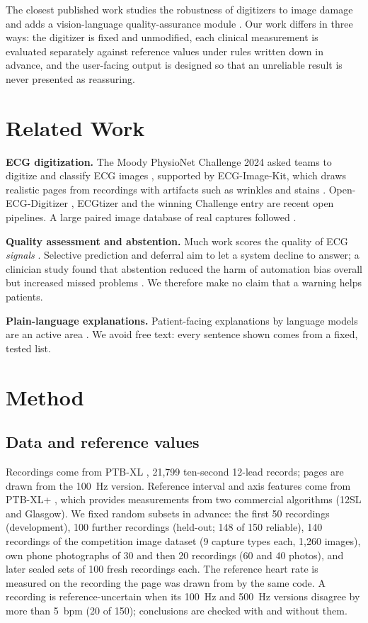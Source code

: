 \documentclass[conference]{IEEEtran}
\begin{document}
The closest published work studies the robustness of digitizers to image damage \cite{ref54} and adds a vision-language quality-assurance module \cite{ref55}. Our work differs in three ways: the digitizer is fixed and unmodified, each clinical measurement is evaluated separately against reference values under rules written down in advance, and the user-facing output is designed so that an unreliable result is never presented as reassuring.

\section{Related Work}

\textbf{ECG digitization.} The Moody PhysioNet Challenge 2024 asked teams to digitize and classify ECG images \cite{ref2}, supported by ECG-Image-Kit, which draws realistic pages from recordings with artifacts such as wrinkles and stains \cite{ref1}. Open-ECG-Digitizer \cite{ref5}, ECGtizer \cite{ref3} and the winning Challenge entry \cite{ref53} are recent open pipelines. A large paired image database of real captures followed \cite{ref4}.

\textbf{Quality assessment and abstention.} Much work scores the quality of ECG \emph{signals} \cite{ref12,ref13,ref14}. Selective prediction and deferral \cite{ref23,ref24} aim to let a system decline to answer; a clinician study found that abstention reduced the harm of automation bias overall but increased missed problems \cite{ref26}. We therefore make no claim that a warning helps patients.

\textbf{Plain-language explanations.} Patient-facing explanations by language models are an active area \cite{ref33}. We avoid free text: every sentence shown comes from a fixed, tested list.

\section{Method}

\subsection{Data and reference values}
Recordings come from PTB-XL \cite{ref45}, 21{,}799 ten-second 12-lead records; pages are drawn from the 100~Hz version. Reference interval and axis features come from PTB-XL+ \cite{ref46}, which provides measurements from two commercial algorithms (12SL and Glasgow). We fixed random subsets in advance: the first 50 recordings (development), 100 further recordings (held-out; 148 of 150 reliable), 140 recordings of the competition image dataset (9 capture types each, 1{,}260 images), own phone photographs of 30 and then 20 recordings (60 and 40 photos), and later sealed sets of 100 fresh recordings each. The reference heart rate is measured on the recording the page was drawn from by the same code. A recording is reference-uncertain when its 100~Hz and 500~Hz versions disagree by more than 5~bpm (20 of 150); conclusions are checked with and without them.
\end{document}
